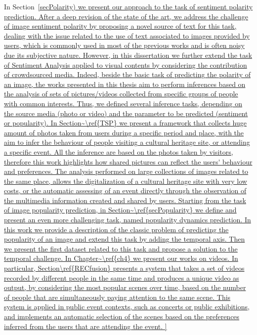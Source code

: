 In Section~\ref{secPolarity) we present our approach to the task of sentiment polarity prediction. After a deep revision of the state of the art, we address the challenge of image sentiment polarity by proposing a novel source of text for this task, dealing with the issue related to the use of text associated to images provided by users, which is commonly used in most of the previous works and is often noisy due its subjective nature.
However, in this dissertation we further extend the task of Sentiment Analysis applied to visual contents by considering the contribution of crowdsourced media. Indeed, beside the basic task of predicting the polarity of an image, the works presented in this thesis aim to perform inferences based on the analysis of sets of pictures/videos collected from specific groups of people with common interests. Thus, we defined several inference tasks, depending on the source media (photo or video) and the parameter to be predicted (sentiment or popularity). 
In Section~\ref{TSP} we present a framework that collects huge amount of photos taken from users during a specific period and place, with the aim to infer the behaviour of people visiting a cultural heritage site, or attending a specific event. All the inference are based on the photos taken by visitors, therefore this work highlights how shared pictures can reflect the users' behaviour and preferences. The analysis performed on large collections of images related to the same place, allows the digitalization of a cultural heritage site with very low costs, or the automatic assessing of an event directly through the observation of the multimedia information created and shared by users. 
Starting from the task of image popularity prediction, in Section~\ref{secPopularity} we define and present an even more challenging task, named popularity dynamics prediction. In this work we provide a description of the classic problem of predicting the popularity of an image and extend this task by adding the temporal axis. 
Then we present the first dataset related to this task and propose a solution to the temporal challenge.
In Chapter~\ref{ch4} we present our works on videos. In particular, Section\ref{RECfusion} presents a system that takes a set of videos recorded by different people in the same time and produces a unique video as output, by considering the most popular scenes over time, based on the number of people that are simultaneously paying attention to the same scene. This system is applied in public event contexts, such as concerts or public exhibitions, and implements an automatic selection of the scenes based on the preferences inferred from the users that are attending the event.
}
